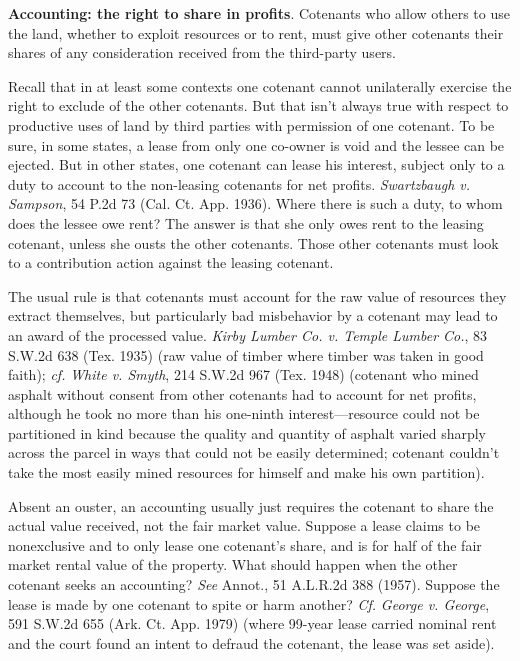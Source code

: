 \item \textbf{Accounting: the right to share in profits}.
\term[accounting]{}Cotenants who allow
others to use the land, whether to exploit resources or to rent, must give
other cotenants their shares of any consideration received from the third-party
users.


Recall that in at least some contexts one cotenant cannot unilaterally exercise
the right to exclude of the other cotenants. But that isn't always true with
respect to productive uses of land by third parties with permission of one
cotenant. To be sure, in some states, a lease from only one co-owner is void
and the lessee can be ejected. But in other states, one cotenant can lease his
interest, subject only to a duty to account to the non-leasing cotenants for
net profits. \emph{Swartzbaugh v. Sampson}, 54 P.2d 73 (Cal. Ct. App. 1936).
Where there is such a duty, to whom does the lessee owe rent? The answer is that
she only owes rent to the leasing cotenant, unless she ousts the other
cotenants. Those other cotenants must look to a contribution action against the
leasing cotenant.



The usual rule is that cotenants must account for the raw value of resources
they extract themselves, but particularly bad misbehavior by a cotenant may lead
to an award of the processed value. \emph{Kirby Lumber Co. v. Temple Lumber
Co.}, 83 S.W.2d 638 (Tex. 1935) (raw value of timber where timber was taken in
good faith); \emph{cf.} \emph{White v. Smyth}, 214 S.W.2d 967 (Tex. 1948)
(cotenant who mined asphalt without consent from other cotenants had to account
for net profits, although he took no more than his one-ninth interest---resource
could not be partitioned in kind because the quality and quantity of asphalt
varied sharply across the parcel in ways that could not be easily determined;
cotenant couldn't take the most easily mined resources for himself and make his
own partition).

Absent an ouster, an accounting usually just requires the cotenant to share the
actual value received, not the fair market value. Suppose a lease claims to be
nonexclusive and to only lease one cotenant's share, and is for half of the fair
market rental value of the property. What should happen when the other cotenant
seeks an accounting? \emph{See} Annot., 51 A.L.R.2d 388 (1957). Suppose the
lease is made by one cotenant to spite or harm another? \textit{Cf.}
\emph{George v. George}, 591 S.W.2d 655 (Ark. Ct. App. 1979) (where 99-year
lease carried nominal rent and the court found an intent to defraud the
cotenant, the lease was set aside).

